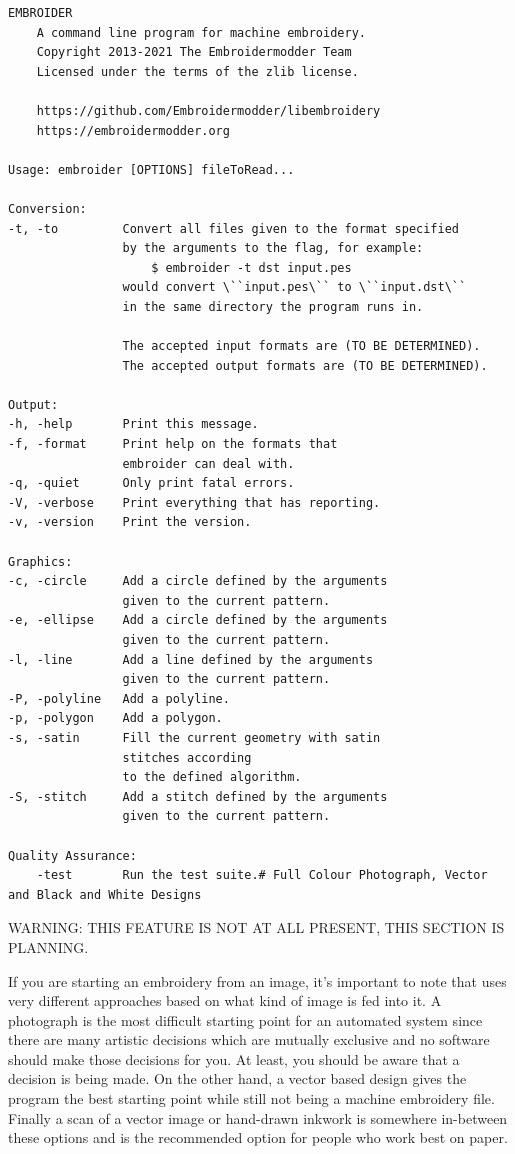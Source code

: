 \begin{verbatim}
EMBROIDER
    A command line program for machine embroidery.
    Copyright 2013-2021 The Embroidermodder Team
    Licensed under the terms of the zlib license.

    https://github.com/Embroidermodder/libembroidery
    https://embroidermodder.org

Usage: embroider [OPTIONS] fileToRead...

Conversion:
-t, -to         Convert all files given to the format specified
                by the arguments to the flag, for example:
                    $ embroider -t dst input.pes
                would convert \``input.pes\`` to \``input.dst\``
                in the same directory the program runs in.

                The accepted input formats are (TO BE DETERMINED).
                The accepted output formats are (TO BE DETERMINED).

Output:
-h, -help       Print this message.
-f, -format     Print help on the formats that
                embroider can deal with.
-q, -quiet      Only print fatal errors.
-V, -verbose    Print everything that has reporting.
-v, -version    Print the version.

Graphics:
-c, -circle     Add a circle defined by the arguments
                given to the current pattern.
-e, -ellipse    Add a circle defined by the arguments
                given to the current pattern.
-l, -line       Add a line defined by the arguments
                given to the current pattern.
-P, -polyline   Add a polyline.
-p, -polygon    Add a polygon.
-s, -satin      Fill the current geometry with satin
                stitches according
                to the defined algorithm.
-S, -stitch     Add a stitch defined by the arguments
                given to the current pattern.

Quality Assurance:
    -test       Run the test suite.# Full Colour Photograph, Vector and Black and White Designs

\end{verbatim}

WARNING: THIS FEATURE IS NOT AT ALL PRESENT, THIS SECTION IS PLANNING.

If you are starting an embroidery from an image, it's important to note that \embname uses very different
approaches based on what kind of image is fed into it. A photograph is the most difficult starting point
for an automated system since there are many artistic decisions which are mutually exclusive and
no software should make those decisions for you. At least, you should be aware that a decision is being made.
On the other hand, a vector based design gives the program the best starting point while still not being
a machine embroidery file. Finally a scan of a vector image or hand-drawn inkwork is somewhere in-between
these options and is the recommended option for people who work best on paper.

